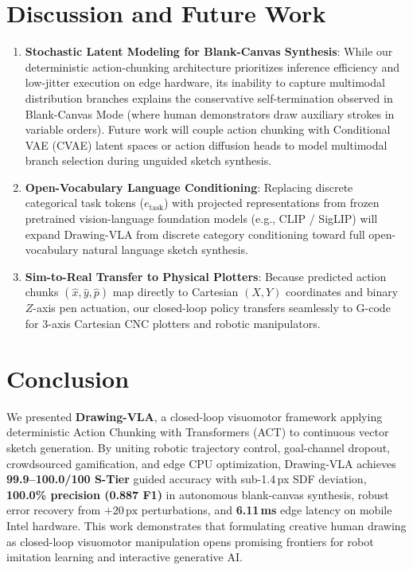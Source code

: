 \documentclass[10pt,twocolumn,letterpaper]{article}
\begin{document}
\section{Discussion and Future Work}
\begin{enumerate}
  \item \textbf{Stochastic Latent Modeling for Blank-Canvas Synthesis}: While our deterministic action-chunking architecture prioritizes inference efficiency and low-jitter execution on edge hardware, its inability to capture multimodal distribution branches explains the conservative self-termination observed in Blank-Canvas Mode (where human demonstrators draw auxiliary strokes in variable orders). Future work will couple action chunking with Conditional VAE (CVAE) latent spaces or action diffusion heads to model multimodal branch selection during unguided sketch synthesis.
  \item \textbf{Open-Vocabulary Language Conditioning}: Replacing discrete categorical task tokens ($e_{\text{task}}$) with projected representations from frozen pretrained vision-language foundation models (e.g., CLIP / SigLIP) will expand Drawing-VLA from discrete category conditioning toward full open-vocabulary natural language sketch synthesis.
  \item \textbf{Sim-to-Real Transfer to Physical Plotters}: Because predicted action chunks $(\hat{x}, \hat{y}, \hat{p})$ map directly to Cartesian $(X, Y)$ coordinates and binary $Z$-axis pen actuation, our closed-loop policy transfers seamlessly to G-code for 3-axis Cartesian CNC plotters and robotic manipulators.
\end{enumerate}

\section{Conclusion}

We presented \textbf{Drawing-VLA}, a closed-loop visuomotor framework applying deterministic Action Chunking with Transformers (ACT) to continuous vector sketch generation. By uniting robotic trajectory control, goal-channel dropout, crowdsourced gamification, and edge CPU optimization, Drawing-VLA achieves \textbf{99.9--100.0/100 S-Tier} guided accuracy with sub-1.4\,px SDF deviation, \textbf{100.0\% precision (0.887 F1)} in autonomous blank-canvas synthesis, robust error recovery from $+20\,\text{px}$ perturbations, and \textbf{6.11\,ms} edge latency on mobile Intel hardware. This work demonstrates that formulating creative human drawing as closed-loop visuomotor manipulation opens promising frontiers for robot imitation learning and interactive generative AI.
\end{document}
